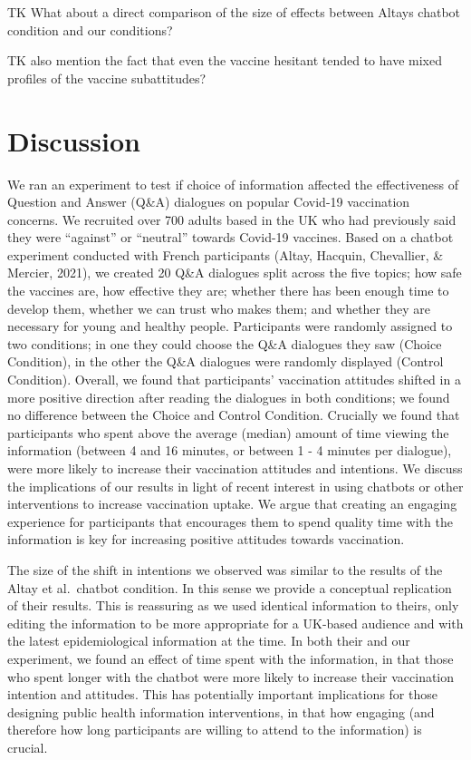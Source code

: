 \documentclass[
  english,
  ,jou,floatsintext]{apa6}
\begin{document}
TK What about a direct comparison of the size of effects between Altays chatbot condition and our conditions?

TK also mention the fact that even the vaccine hesitant tended to have mixed profiles of the vaccine subattitudes?

\hypertarget{discussion}{%
\section{Discussion}\label{discussion}}

We ran an experiment to test if choice of information affected the effectiveness of Question and Answer (Q\&A) dialogues on popular Covid-19 vaccination concerns. We recruited over 700 adults based in the UK who had previously said they were ``against'' or ``neutral'' towards Covid-19 vaccines. Based on a chatbot experiment conducted with French participants (Altay, Hacquin, Chevallier, \& Mercier, 2021), we created 20 Q\&A dialogues split across the five topics; how safe the vaccines are, how effective they are; whether there has been enough time to develop them, whether we can trust who makes them; and whether they are necessary for young and healthy people. Participants were randomly assigned to two conditions; in one they could choose the Q\&A dialogues they saw (Choice Condition), in the other the Q\&A dialogues were randomly displayed (Control Condition). Overall, we found that participants' vaccination attitudes shifted in a more positive direction after reading the dialogues in both conditions; we found no difference between the Choice and Control Condition. Crucially we found that participants who spent above the average (median) amount of time viewing the information (between 4 and 16 minutes, or between 1 - 4 minutes per dialogue), were more likely to increase their vaccination attitudes and intentions. We discuss the implications of our results in light of recent interest in using chatbots or other interventions to increase vaccination uptake. We argue that creating an engaging experience for participants that encourages them to spend quality time with the information is key for increasing positive attitudes towards vaccination.

The size of the shift in intentions we observed was similar to the results of the Altay et al.~chatbot condition. In this sense we provide a conceptual replication of their results. This is reassuring as we used identical information to theirs, only editing the information to be more appropriate for a UK-based audience and with the latest epidemiological information at the time. In both their and our experiment, we found an effect of time spent with the information, in that those who spent longer with the chatbot were more likely to increase their vaccination intention and attitudes. This has potentially important implications for those designing public health information interventions, in that how engaging (and therefore how long participants are willing to attend to the information) is crucial.
\end{document}

